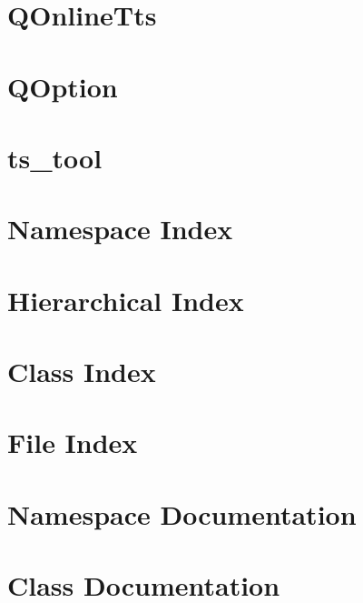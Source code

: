 \let\mypdfximage\pdfximage\def\pdfximage{\immediate\mypdfximage}\documentclass[twoside]{book}
\newcommand{\+}{\discretionary{\mbox{\scriptsize$\hookleftarrow$}}{}{}}
\begin{document}
\chapter{QOnline\+Tts}
\label{md_src_third_party_qonlinetranslator_docs_QOnlineTts}

\chapter{QOption}
\label{md_src_third_party_qonlinetranslator_docs_QOption}

\chapter{ts\+\_\+tool}
\label{md_usr_bin_README}

\chapter{Namespace Index}

\chapter{Hierarchical Index}

\chapter{Class Index}

\chapter{File Index}

\chapter{Namespace Documentation}


\chapter{Class Documentation}


























\end{document}
